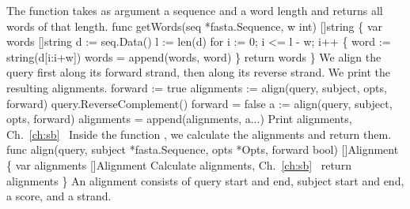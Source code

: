 The function  takes as argument a sequence and a word
length and returns all words of that length.
\nwenddocs{}\plusendmoddef\nwstartdeflinemarkup{}\nwenddeflinemarkup
func getWords(seq *fasta.Sequence, w int) []string \{
          var words []string
          d := seq.Data()
          l := len(d)
          for i := 0; i <= l - w; i++ \{
                  word := string(d[i:i+w])
                  words = append(words, word)
          \}
          return words
\}
\nwendcode{}\nwdocspar
We align the query first along its forward strand, then along its
reverse strand. We print the resulting alignments.
\nwenddocs{}\endmoddef\nwstartdeflinemarkup{}\nwenddeflinemarkup
forward := true
alignments := align(query, subject, opts, forward)
query.ReverseComplement()
forward = false
a := align(query, subject, opts, forward)
alignments = append(alignments, a...)
\LA{}Print alignments, Ch.~\ref{ch:sb}~{\nwtagstyle{}}\RA{}
\nwendcode{}\nwdocspar
Inside the function , we calculate the alignments and return
them.
\nwenddocs{}\plusendmoddef\nwstartdeflinemarkup{}\nwenddeflinemarkup
func align(query, subject *fasta.Sequence,
          opts *Opts, forward bool) []Alignment \{
          var alignments []Alignment
          \LA{}Calculate alignments, Ch.~\ref{ch:sb}~{\nwtagstyle{}}\RA{}
          return alignments
\}
\nwendcode{}\nwdocspar
An alignment consists of query start and end, subject start and end,
a score, and a strand.
\nwenddocs{}\plusendmoddef\nwstartdeflinemarkup{}\nwenddeflinemarkup
